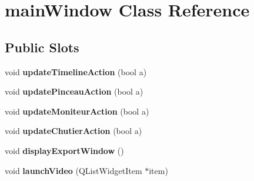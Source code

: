 \hypertarget{classmain_window}{\section{main\-Window \-Class \-Reference}
\label{classmain_window}
}
\subsection*{\-Public \-Slots}
\begin{DoxyCompactItemize}
\item 
\hypertarget{classmain_window_a1e3b0c0362c7a00799a5b5ed4383ba68}{void {\bfseries update\-Timeline\-Action} (bool a)}\label{classmain_window_a1e3b0c0362c7a00799a5b5ed4383ba68}

\item 
\hypertarget{classmain_window_ad2056d0c69d6c1f1a94286175ac757ae}{void {\bfseries update\-Pinceau\-Action} (bool a)}\label{classmain_window_ad2056d0c69d6c1f1a94286175ac757ae}

\item 
\hypertarget{classmain_window_a8743acd4677c3ff95abfa6fd760dab6e}{void {\bfseries update\-Moniteur\-Action} (bool a)}\label{classmain_window_a8743acd4677c3ff95abfa6fd760dab6e}

\item 
\hypertarget{classmain_window_a0afa781b310e1b1d008ec054161d6fcb}{void {\bfseries update\-Chutier\-Action} (bool a)}\label{classmain_window_a0afa781b310e1b1d008ec054161d6fcb}

\item 
\hypertarget{classmain_window_a96c52dfe34f45eda1851e4efbbf40702}{void {\bfseries display\-Export\-Window} ()}\label{classmain_window_a96c52dfe34f45eda1851e4efbbf40702}

\item 
\hypertarget{classmain_window_af26494a82495fa6398cb0b4a67d1e784}{void {\bfseries launch\-Video} (\-Q\-List\-Widget\-Item $\ast$item)}\label{classmain_window_af26494a82495fa6398cb0b4a67d1e784}

\end{DoxyCompactItemize}
